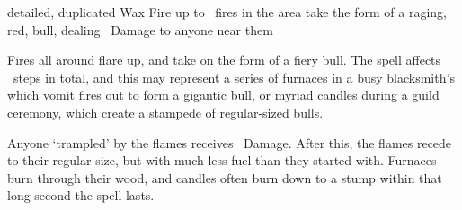   {detailed, duplicated}%
  {Wax}%
  {Fire}%
  {}%
  {up to \spellArea\ fires in the area take the form of a raging, red, bull, dealing \rollConv\ Damage to anyone near them}%
  {
    Fires all around flare up, and take on the form of a fiery bull.
    The spell affects \spellArea\ steps in total, and this may represent a series of furnaces in a busy blacksmith's which vomit fires out to form a gigantic bull, or myriad candles during a guild ceremony, which create a stampede of regular-sized bulls.

  Anyone `trampled' by the flames receives \rollConv\ Damage.
  After this, the flames recede to their regular size, but with much less fuel than they started with.
  Furnaces burn through their wood, and candles often burn down to a stump within that long second the spell lasts.
  }

